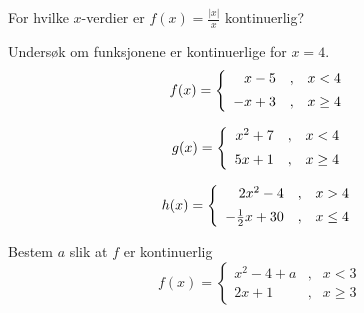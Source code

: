 





\opgt

For hvilke $ x $-verdier er $ f(x)=\frac{|x|}{x} $ kontinuerlig?

Undersøk om funksjonene er kontinuerlige for $ x=4 $.
\begin{equation*}
	f(x)= \left\lbrace{
		\begin{array}{rcr}
			x-5 &,&x<4 \br
			-x+3   &,& x\geq 4
		\end{array}
	}\right. 
\end{equation*}

\begin{equation*}
	g(x)= \left\lbrace{
		\begin{array}{rcr}
			x^2+7 &,&x<4 \br
			5x+1   &,& x\geq 4
		\end{array}
	}\right. 
\end{equation*}

\begin{equation*}
	h(x)= \left\lbrace{
		\begin{array}{rcr}
			2x^2-4 &,&x>4 \br
			-\frac{1}{2}x+30   &,& x\leq 4
		\end{array}
	}\right. 
\end{equation*}

Bestem $ a $ slik at $ f $ er kontinuerlig
\begin{equation*}
	f(x)= \left\lbrace{
		\begin{array}{rcr}
			x^2 - 4 + a &,& x < 3 \\
			2x + 1 & ,& x \geq 3
		\end{array}
	}\right. 
\end{equation*}

